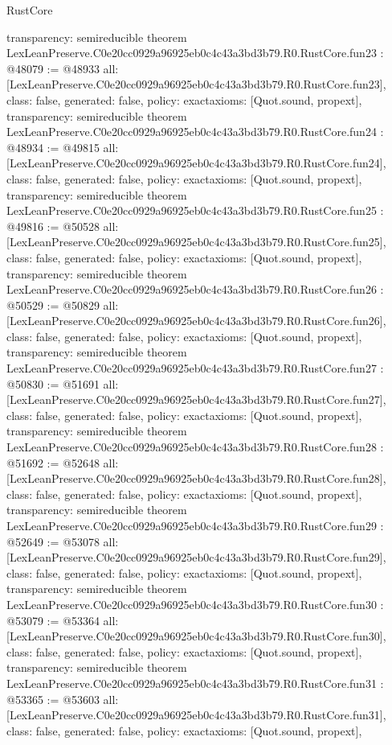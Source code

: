 \begin{lexlean}{RustCore}
\begin{coremodule}
{  transparency: semireducible
}
theorem LexLeanPreserve.C0e20cc0929a96925eb0c4c43a3bd3b79.R0.RustCore.fun23 : @48079 := @48933 {
  all: [LexLeanPreserve.C0e20cc0929a96925eb0c4c43a3bd3b79.R0.RustCore.fun23],
  class: false,
  generated: false,
  policy: exact{axioms: [Quot.sound, propext]},
  transparency: semireducible
}
theorem LexLeanPreserve.C0e20cc0929a96925eb0c4c43a3bd3b79.R0.RustCore.fun24 : @48934 := @49815 {
  all: [LexLeanPreserve.C0e20cc0929a96925eb0c4c43a3bd3b79.R0.RustCore.fun24],
  class: false,
  generated: false,
  policy: exact{axioms: [Quot.sound, propext]},
  transparency: semireducible
}
theorem LexLeanPreserve.C0e20cc0929a96925eb0c4c43a3bd3b79.R0.RustCore.fun25 : @49816 := @50528 {
  all: [LexLeanPreserve.C0e20cc0929a96925eb0c4c43a3bd3b79.R0.RustCore.fun25],
  class: false,
  generated: false,
  policy: exact{axioms: [Quot.sound, propext]},
  transparency: semireducible
}
theorem LexLeanPreserve.C0e20cc0929a96925eb0c4c43a3bd3b79.R0.RustCore.fun26 : @50529 := @50829 {
  all: [LexLeanPreserve.C0e20cc0929a96925eb0c4c43a3bd3b79.R0.RustCore.fun26],
  class: false,
  generated: false,
  policy: exact{axioms: [Quot.sound, propext]},
  transparency: semireducible
}
theorem LexLeanPreserve.C0e20cc0929a96925eb0c4c43a3bd3b79.R0.RustCore.fun27 : @50830 := @51691 {
  all: [LexLeanPreserve.C0e20cc0929a96925eb0c4c43a3bd3b79.R0.RustCore.fun27],
  class: false,
  generated: false,
  policy: exact{axioms: [Quot.sound, propext]},
  transparency: semireducible
}
theorem LexLeanPreserve.C0e20cc0929a96925eb0c4c43a3bd3b79.R0.RustCore.fun28 : @51692 := @52648 {
  all: [LexLeanPreserve.C0e20cc0929a96925eb0c4c43a3bd3b79.R0.RustCore.fun28],
  class: false,
  generated: false,
  policy: exact{axioms: [Quot.sound, propext]},
  transparency: semireducible
}
theorem LexLeanPreserve.C0e20cc0929a96925eb0c4c43a3bd3b79.R0.RustCore.fun29 : @52649 := @53078 {
  all: [LexLeanPreserve.C0e20cc0929a96925eb0c4c43a3bd3b79.R0.RustCore.fun29],
  class: false,
  generated: false,
  policy: exact{axioms: [Quot.sound, propext]},
  transparency: semireducible
}
theorem LexLeanPreserve.C0e20cc0929a96925eb0c4c43a3bd3b79.R0.RustCore.fun30 : @53079 := @53364 {
  all: [LexLeanPreserve.C0e20cc0929a96925eb0c4c43a3bd3b79.R0.RustCore.fun30],
  class: false,
  generated: false,
  policy: exact{axioms: [Quot.sound, propext]},
  transparency: semireducible
}
theorem LexLeanPreserve.C0e20cc0929a96925eb0c4c43a3bd3b79.R0.RustCore.fun31 : @53365 := @53603 {
  all: [LexLeanPreserve.C0e20cc0929a96925eb0c4c43a3bd3b79.R0.RustCore.fun31],
  class: false,
  generated: false,
  policy: exact{axioms: [Quot.sound, propext]},
}
\end{coremodule}
\end{lexlean}
